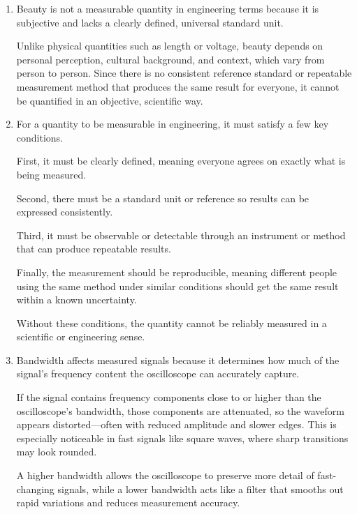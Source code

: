 \documentclass[../main.tex]{subfiles}
\begin{document}
\begin{enumerate}[label=\textbf{\arabic*.}]
	So instead of a strict yes/no based only on the measured value, you must consider whether the value plus or minus its uncertainty overlaps the decision threshold.

	
	
	\item Beauty  is not a measurable quantity in engineering terms because it is subjective and lacks a clearly defined, universal standard unit.

	Unlike physical quantities such as length or voltage, beauty depends on personal perception, cultural background, and context, which vary from person to person. Since there is no consistent reference standard or repeatable measurement method that produces the same result for everyone, it cannot be quantified in an objective, scientific way.

	
	\item For a quantity to be measurable in engineering, it must satisfy a few key conditions.

	First, it must be clearly defined, meaning everyone agrees on exactly what is being measured. 
	
	Second, there must be a standard unit or reference so results can be expressed consistently. 
	
	Third, it must be observable or detectable through an instrument or method that can produce repeatable results. 
	
	Finally, the measurement should be reproducible, meaning different people using the same method under similar conditions should get the same result within a known uncertainty.

	Without these conditions, the quantity cannot be reliably measured in a scientific or engineering sense.

	
	\item Bandwidth affects measured signals because it determines how much of the signal’s frequency content the oscilloscope can accurately capture.
	
	If the signal contains frequency components close to or higher than the oscilloscope’s bandwidth, those components are attenuated, so the waveform appears distorted—often with reduced amplitude and slower edges. This is especially noticeable in fast signals like square waves, where sharp transitions may look rounded.

	A higher bandwidth allows the oscilloscope to preserve more detail of fast-changing signals, while a lower bandwidth acts like a filter that smooths out rapid variations and reduces measurement accuracy.


\end{enumerate}
\end{document}
